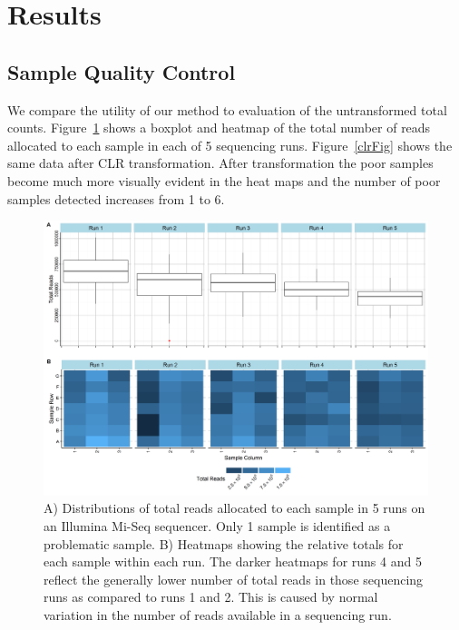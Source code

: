 \documentclass{article}\usepackage[]{graphicx}\usepackage[]{color}
\theoremstyle{definition}
\begin{document}


\section{Results}

\subsection{Sample Quality Control}

We compare the utility of our method to evaluation of the untransformed total counts.  Figure~\ref{totalFig} shows a boxplot and heatmap of the total number of reads allocated to each sample in each of 5 sequencing runs.  Figure~\ref{clrFig} shows the same data after CLR transformation.  After transformation the poor samples become much more visually evident in the heat maps and the number of poor samples detected increases from 1 to 6.  \\

\begin{figure}
\includegraphics[scale=.5]{./Figures/IO_Repro_Combined_RawTotals}
\caption{A) Distributions of total reads allocated to each sample in 5 runs on an Illumina Mi-Seq sequencer. Only 1 sample is identified as a problematic sample. B) Heatmaps showing the relative totals for each sample within each run.  The darker heatmaps for runs 4 and 5 reflect the generally lower number of total reads in those sequencing runs as compared to runs 1 and 2.  This is caused by normal variation in the number of reads available in a sequencing run.}
\label{totalFig}
\end{figure}
 
\end{document}
